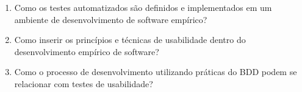 \begin{enumerate}
\item Como os testes automatizados são definidos e implementados em um ambiente de desenvolvimento de software empírico?
\item Como inserir os princípios e técnicas de usabilidade dentro do desenvolvimento empírico de software?
\item Como o processo de desenvolvimento utilizando práticas do BDD podem se relacionar com testes de usabilidade?
\end{enumerate}


\begin{comment}
A partir das questões de pesquisa, foram definidas questões especificas e para cada questão, foram definidas métricas:




\begin{enumerate}
\item \textbf{Questão 01: }Qual a estimativa de esforço gasto com testes?

	\textbf{Métrica: } Pontos de história / horas gastas com testes por sprint.

\item \textbf{Questão 02: }Qual a cobertura de testes de aceitação apresentada?

	\textbf{Métrica: } Porcentagem de cobertura de testes.

\item \textbf{Questão 03: }Qual a viabilidade da adoção de práticas de usabilidade em conjunto com as metodologias ágeis utilizadas no projeto?

	Observar a integração das atividades ao longo do ciclo de vida do projeto e realizar entrevista com os participantes sobre as principais dificuldades encontradas na integração das duas metodologias.
\item \textbf{Questão 04: }Qual a conformidade do sistema com as heurísticas de usabilidade?

	\textbf{Métrica: }
\item \textbf{Questão 05: }Qual a capacidade do sistema de atrair o usuário?
	
	\textbf{Métrica: }
\item \textbf{Questão 06:} Qual a capacidade do sistema de possibilitar ao usuário aprender a manuseá-lo?

	\textbf{Métrica: }
\end{enumerate}
\end{comment}


